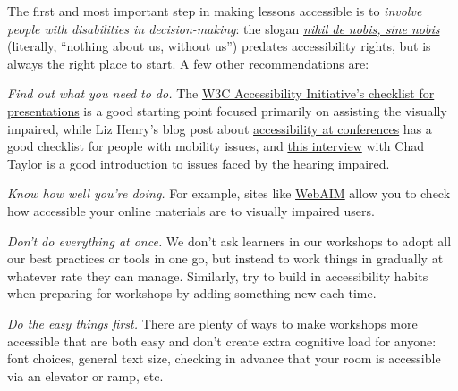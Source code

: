 The first and most important step in making lessons accessible is
to \emph{involve people with disabilities in decision-making}: the
slogan \emph{\href{https://en.wikipedia.org/wiki/Nothing\_About\_Us\_Without\_Us}{nihil
de nobis, sine nobis}} (literally, ``nothing about us, without us'')
predates accessibility rights, but is always the right place to start.
A few other recommendations are:

\begin{gitemize}

\item
  \emph{Find out what you need to do.}
  The \href{http://www.w3.org/WAI/training/accessible}{W3C
  Accessibility Initiative's checklist for presentations} is a good
  starting point focused primarily on assisting the visually impaired,
  while Liz Henry's blog post
  about \href{https://modelviewculture.com/pieces/unlocking-the-invisible-elevator-accessibility-at-tech-conferences}{accessibility
  at conferences} has a good checklist for people with mobility
  issues,
  and \href{https://modelviewculture.com/pieces/qa-making-tech-events-accessible-to-the-deaf-community}{this
  interview} with Chad Taylor is a good introduction to issues faced
  by the hearing impaired.

\item
  \emph{Know how well you're doing.} For example, sites
  like \href{http://webaim.org/}{WebAIM} allow you to check how
  accessible your online materials are to visually impaired users.

\item
  \emph{Don't do everything at once.} We don't ask learners in our
  workshops to adopt all our best practices or tools in one go, but
  instead to work things in gradually at whatever rate they can
  manage.  Similarly, try to build in accessibility habits when
  preparing for workshops by adding something new each time.

\item
  \emph{Do the easy things first.} There are plenty of ways to make
  workshops more accessible that are both easy and don't create extra
  cognitive load for anyone: font choices, general text size, checking
  in advance that your room is accessible via an elevator or ramp,
  etc.

\end{gitemize}


